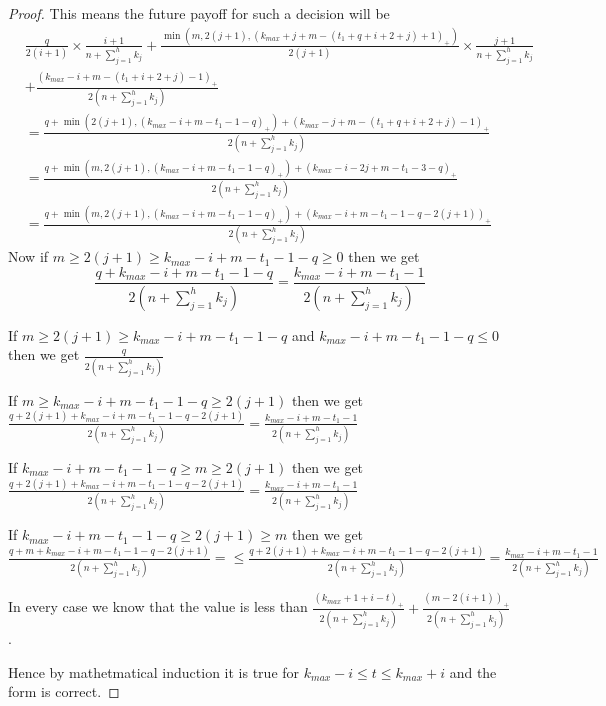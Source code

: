 \documentclass[a4paper,10pt]{article}
\newcommand{\denominator}{\ensuremath{n+\sum\limits_{j=1}^{h} k_{j}}}
\newcommand{\pospart}[1]{\left( #1 \right)_{+}}
\theoremstyle{definition}
\theoremstyle{definition}
\theoremstyle{remark}
\theoremstyle{definition}
\begin{document}
\begin{proof}
This means the future payoff for such a decision will be
\begin{align*}
&\frac{q}{2(i+1)} \times \frac{i+1}{\denominator} +\frac{\min(m,2(j+1),\pospart{k_{max}+j+m-(t_{1}+q+i+2+j)+1})}{2(j+1)} \times \frac{j+1}{\denominator} \\
&+ \frac{\pospart{k_{max}-i+m-(t_{1}+i+2+j)-1}}{2 \left( \denominator \right)} \\
&=\frac{q+\min (2(j+1),\pospart{k_{max}-i+m-t_{1}-1-q})+\pospart{k_{max}-j+m-(t_{1}+q+i+2+j)-1}}{2 \left( \denominator \right)} \\
&=\frac{q+\min (m,2(j+1), \pospart{k_{max}-i+m-t_{1}-1-q}) +\pospart{k_{max}-i-2j+m-t_{1}-3-q}}{2 \left( \denominator \right)} \\
&=\frac{q+\min(m,2(j+1), \pospart{k_{max}-i+m-t_{1}-1-q})+\pospart{k_{max}-i+m-t_{1}-1-q-2(j+1)}}{2 \left( \denominator \right)}
\end{align*}
Now if $m \geq 2(j+1) \geq k_{max}-i+m-t_{1}-1-q \geq 0$ then we get
$$\frac{q+k_{max}-i+m-t_{1}-1-q}{2 \left( \denominator \right)}=\frac{k_{max}-i+m-t_{1}-1}{2 \left( \denominator \right)}$$

If $m \geq 2(j+1) \geq k_{max}-i+m-t_{1}-1-q$ and $k_{max}-i+m-t_{1}-1-q \leq 0$ then we get
$\frac{q}{2 \left( \denominator \right)}$

If $m \geq k_{max}-i+m-t_{1}-1-q \geq 2(j+1)$ then we get
$\frac{q+2(j+1)+k_{max}-i+m-t_{1}-1-q-2(j+1)}{2 \left( \denominator \right)}=\frac{k_{max}-i+m-t_{1}-1}{2 \left( \denominator \right)}$

If $k_{max}-i+m-t_{1}-1-q \geq m \geq 2(j+1)$ then we get
$\frac{q+2(j+1)+k_{max}-i+m-t_{1}-1-q-2(j+1)}{2 \left( \denominator \right)}=\frac{k_{max}-i+m-t_{1}-1}{2 \left( \denominator \right)}$

If $k_{max}-i+m-t_{1}-1-q \geq 2(j+1) \geq m$ then we get
$\frac{q+m+k_{max}-i+m-t_{1}-1-q-2(j+1)}{2 \left( \denominator \right)}= \leq \frac{q+2(j+1)+k_{max}-i+m-t_{1}-1-q-2(j+1)}{2 \left( \denominator \right)} = \frac{k_{max}-i+m-t_{1}-1}{2 \left( \denominator \right)}$


In every case we know that the value is less than $\frac{\pospart{k_{max}+1+i-t}}{2 \left( \denominator \right)} + \frac{\pospart{m-2(i+1)}}{2 \left( \denominator \right)}$.

Hence by mathetmatical induction it is true for $k_{max}-i \leq t \leq k_{max}+i$ and the form is correct.

\end{proof}
\end{document}
